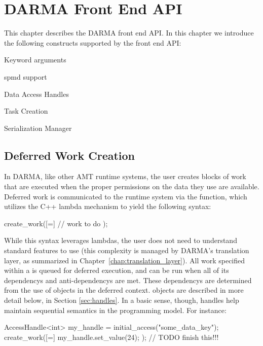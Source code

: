 
\chapter{DARMA Front End API}
\label{chap:front_end}
This chapter describes the DARMA \gls{front end} \gls{API}. In this chapter we
introduce the following constructs supported by the \gls{front end} \gls{API}:
\begin{compactitem}
\item Keyword arguments
\item \gls{spmd} support
\item Data Access Handles
\item Task Creation
\item Serialization Manager
\end{compactitem}


\section{Deferred Work Creation}
\label{sec:deferred}
In DARMA, like other AMT runtime systems, the user creates blocks of work that
are executed when the proper permissions on the data they use are available. 
Deferred work is communicated to the runtime system via the
 function, which utilizes the C++ lambda mechanism to
yield the following syntax:
\begin{CppCode}
  create_work([=]{
    // work to do
  });
\end{CppCode}

While this syntax leverages  lambdas, the user does not need to understand
 standard features to use  (this
complexity is managed by DARMA's translation layer, as summarized in
Chapter~\ref{chap:translation_layer}).  All work specified within a
 is queued for deferred execution, and can be run when
all of its \glspl{dependency} and \glspl{anti-dependency} are met.  
These \glspl{dependency} are determined from the use of 
 objects in the deferred context. 
 objects are described in more detail below, in
Section \ref{sec:handles}.  In a basic sense, though, handles help maintain
\gls{sequential semantics} in the programming model.  For instance:
\begin{CppCode}
AccessHandle<int> my_handle = initial_access("some_data_key");
create_work([=]{
  my_handle.set_value(24);
});
// TODO finish this!!!

\end{CppCode}

